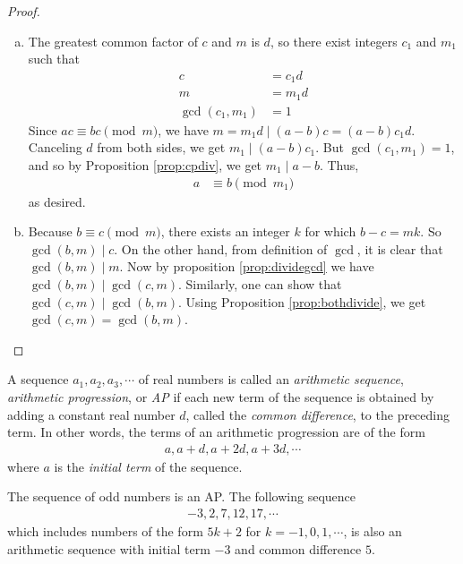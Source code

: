 \documentclass{subfile}
\begin{document}
	\begin{proof}
		$ $
		\begin{enumerate}[(a)]
			\item The greatest common factor of $c$ and $m$ is $d$, so  there exist integers $c_1$ and $m_1$ such that
				\begin{align*}
				 	c
				 		& =c_1d\\
				 	m
				 		& = m_1 d\\
				 	\gcd(c_1,m_1)
				 		& = 1
				\end{align*}
			Since $ac \equiv bc \pmod m$, we have $m=m_1d\mid (a-b)c=(a-b)c_1d$. Canceling $d$ from both sides, we get $m_1\mid (a-b)c_1$. But $\gcd(c_1,m_1)=1$, and so by Proposition \ref{prop:cpdiv}, we get $m_1\mid a-b$. Thus,
				\begin{align*}
					a
						& \equiv b \pmod{m_1}
				\end{align*}
			as desired.

			\item Because $b \equiv c \pmod m$, there exists an integer $k$ for which $b-c=mk$. So $\gcd(b,m)\mid c$. On the other hand, from definition of $\gcd$, it is clear that $\gcd(b,m)\mid m$. Now by proposition \ref{prop:dividegcd} we have $\gcd(b,m)\mid \gcd(c,m)$. Similarly, one can show that $\gcd(c,m)\mid \gcd(b,m)$. Using Proposition \ref{prop:bothdivide}, we get $\gcd(c,m)=\gcd(b,m)$.
		\end{enumerate}
	\end{proof}

	\begin{definition}\label{def:AP}
		A sequence $a_1, a_2, a_3, \cdots$ of real numbers is called an \textit{arithmetic sequence}, \textit{arithmetic progression}, or \textit{AP} if each new term of the sequence is obtained by adding a constant real number $d$, called the \textit{common difference}, to the preceding term. In other words, the terms of an arithmetic progression are of the form
			\begin{align*}
				a, a+d, a+2d, a+3d, \cdots
			\end{align*}
		where $a$ is the \textit{initial term} of the sequence.
	\end{definition}

	\begin{example}
		The sequence of odd numbers is an AP. The following sequence
			\begin{align*}
				-3, 2, 7, 12, 17, \cdots
			\end{align*}
		which includes numbers of the form $5k+2$ for $k=-1,0,1,\cdots$, is also an arithmetic sequence with initial term $-3$ and common difference $5$.
	\end{example}
\end{document}
